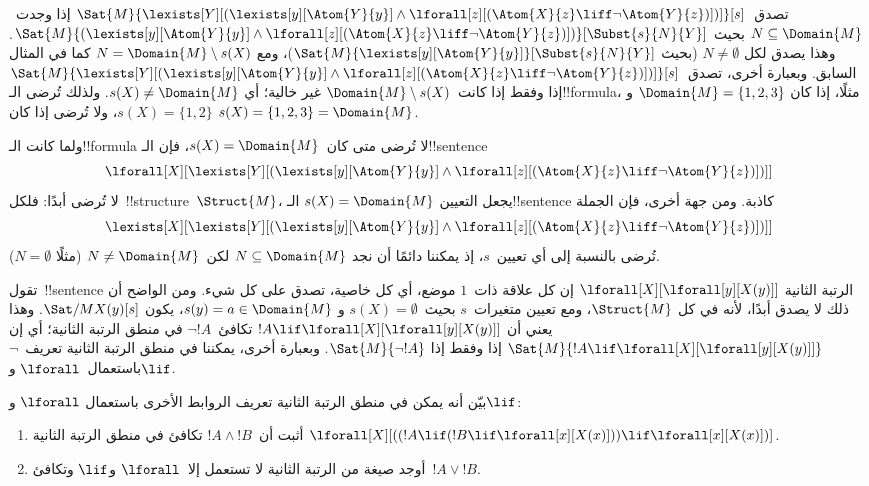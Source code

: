 \documentclass[../../../include/open-logic-section]{subfiles}
\begin{document}
\begin{ex}
  تصدق~$\Sat{M}{\lexists[Y][(\lexists[y][\Atom{Y}{y}] \land
  \lforall[z][(\Atom{X}{z} \liff \lnot \Atom{Y}{z})])]}[s]$ إذا
  وجدت~$N \subseteq \Domain{M}$ بحيث
  $\Sat{M}{(\lexists[y][\Atom{Y}{y}] \land \lforall[z][(\Atom{X}{z}
  \liff \lnot \Atom{Y}{z})])}[\Subst{s}{N}{Y}]$. وهذا يصدق لكل
  $N \neq \emptyset$ (بحيث
  $\Sat{M}{\lexists[y][\Atom{Y}{y}]}[\Subst{s}{N}{Y}]$)، ومع
  $N = \Domain{M} \setminus s(X)$ كما في المثال السابق. وبعبارة أخرى،
  تصدق~$\Sat{M}{\lexists[Y][(\lexists[y][\Atom{Y}{y}] \land
  \lforall[z][(\Atom{X}{z} \liff \lnot \Atom{Y}{z})])]}[s]$ إذا
  وفقط إذا كانت~$\Domain{M} \setminus s(X)$ غير خالية؛ أي
  $s(X) \neq \Domain{M}$. ولذلك تُرضى الـ!!{formula}، مثلًا، إذا كان
  $\Domain{M} = \{1, 2, 3\}$ و$s(X) = \{1, 2\}$، ولا تُرضى إذا كان
  $s(X) = \{1, 2, 3\} = \Domain{M}$.

  ولما كانت الـ!!{formula} لا تُرضى متى كان~$s(X) = \Domain{M}$، فإن
  الـ!!{sentence}
  \[
  \lforall[X][\lexists[Y][(\lexists[y][\Atom{Y}{y}] \land
      \lforall[z][(\Atom{X}{z} \liff \lnot \Atom{Y}{z})])]]
  \]
  لا تُرضى أبدًا: فلكل~!!{structure}~$\Struct{M}$، يجعل التعيين
  $s(X) = \Domain{M}$ الـ!!{sentence} كاذبة. ومن جهة أخرى، فإن الجملة
  \[
  \lexists[X][\lexists[Y][(\lexists[y][\Atom{Y}{y}] \land
      \lforall[z][(\Atom{X}{z} \liff \lnot \Atom{Y}{z})])]]
  \]
  تُرضى بالنسبة إلى أي تعيين~$s$، إذ يمكننا دائمًا أن نجد
  $N \subseteq \Domain{M}$ لكن~$N \neq \Domain{M}$ (مثلًا
  $N = \emptyset$).
\end{ex}

\begin{ex}
  تقول~!!{sentence} الرتبة الثانية
  $\lforall[X][\lforall[y][X(y)]]$ إن كل علاقة ذات~$1$ موضع، أي كل
  خاصية، تصدق على كل شيء. ومن الواضح أن ذلك لا يصدق أبدًا، لأنه في كل
  $\Struct{M}$، ومع تعيين متغيرات~$s$ بحيث~$s(X) = \emptyset$ و
  $s(y) = a \in \Domain{M}$، يكون
  $\Sat/{M}{X(y)}[s]$. وهذا يعني أن
  $!A \lif \lforall[X][\lforall[y][X(y)]]$ تكافئ~$\lnot !A$ في منطق
  الرتبة الثانية؛ أي إن
  $\Sat{M}{!A \lif \lforall[X][\lforall[y][X(y)]]}$ إذا وفقط إذا
  $\Sat{M}{\lnot !A}$. وبعبارة أخرى، يمكننا في منطق الرتبة الثانية
  تعريف~$\lnot$ باستعمال~$\lforall$ و$\lif$.
\end{ex}

\begin{prob}
  بيّن أنه يمكن في منطق الرتبة الثانية تعريف الروابط الأخرى باستعمال
  $\lforall$ و$\lif$:
  \begin{enumerate}
    \item أثبت أن~$!A \land !B$ تكافئ في منطق الرتبة الثانية
    $\lforall[X][((!A \lif (!B \lif \lforall[x][X(x)])) \lif
    \lforall[x][X(x)])]$.
    \item أوجد صيغة من الرتبة الثانية لا تستعمل إلا~$\lforall$
    و$\lif$ وتكافئ~$!A \lor !B$.
  \end{enumerate}
\end{prob}
\end{document}
